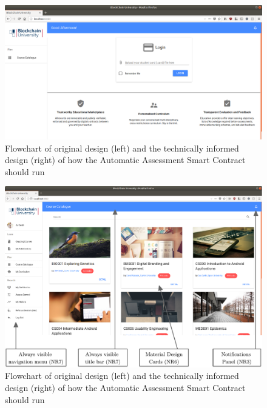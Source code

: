 \begin{figure}[!ht]
	\centering
	\includegraphics[width=1.0\textwidth]{Learner_login}
	\caption[Learner Application Login Page]
	{Flowchart of original design (left) and the technically informed design (right) of how the Automatic Assessment Smart Contract should run}
	\label{fig:Learner_login}
\end{figure}

\begin{figure}[!ht]
	\centering
	\includegraphics[width=1.0\textwidth]{Learner_allcourses}
	\caption[Learner Application Course Catalogue Page]
	{Flowchart of original design (left) and the technically informed design (right) of how the Automatic Assessment Smart Contract should run}
	\label{fig:Learner_allcourses}
\end{figure}

